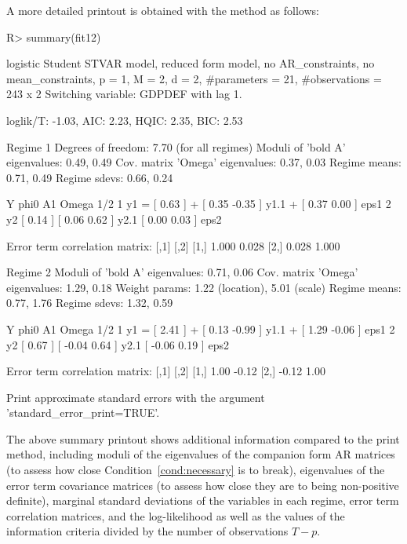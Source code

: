 \documentclass[nojss]{jss}
\begin{document}
A more detailed printout is obtained with the  method as follows:
%
\begin{CodeChunk}
\begin{CodeInput}
R> summary(fit12)
\end{CodeInput}
\begin{CodeOutput}
logistic Student STVAR model, reduced form model, no AR_constraints,
no mean_constraints,
  p = 1, M = 2, d = 2, #parameters = 21, #observations = 243 x 2
  Switching variable: GDPDEF with lag 1.

loglik/T: -1.03, AIC: 2.23, HQIC: 2.35, BIC: 2.53

Regime 1
Degrees of freedom: 7.70 (for all regimes)
Moduli of 'bold A' eigenvalues:  0.49, 0.49
Cov. matrix 'Omega' eigenvalues: 0.37, 0.03
Regime means: 0.71, 0.49
Regime sdevs: 0.66, 0.24

   Y     phi0          A1                  Omega        1/2
1 y1 = [ 0.63 ] + [  0.35 -0.35 ] y1.1 + [  0.37 0.00 ]     eps1
2 y2   [ 0.14 ]   [  0.06  0.62 ] y2.1   [  0.00 0.03 ]     eps2

Error term correlation matrix:
      [,1]  [,2]
[1,] 1.000 0.028
[2,] 0.028 1.000

Regime 2
Moduli of 'bold A' eigenvalues:  0.71, 0.06
Cov. matrix 'Omega' eigenvalues: 1.29, 0.18
Weight params: 1.22 (location), 5.01 (scale)
Regime means: 0.77, 1.76
Regime sdevs: 1.32, 0.59

   Y     phi0          A1                  Omega         1/2
1 y1 = [ 2.41 ] + [  0.13 -0.99 ] y1.1 + [  1.29 -0.06 ]     eps1
2 y2   [ 0.67 ]   [ -0.04  0.64 ] y2.1   [ -0.06  0.19 ]     eps2

Error term correlation matrix:
      [,1]  [,2]
[1,]  1.00 -0.12
[2,] -0.12  1.00

Print approximate standard errors with the argument 'standard_error_print=TRUE'.
\end{CodeOutput}
\end{CodeChunk}
%
The above summary printout shows additional information compared to the print method, including moduli of the eigenvalues of the companion form AR matrices (to assess how close Condition~\ref{cond:necessary} is to break), eigenvalues of the error term covariance matrices (to assess how close they are to being non-positive definite), marginal standard deviations of the variables in each regime, error term correlation matrices, and the log-likelihood as well as the values of the information criteria divided by the number of observations $T-p$.
\end{document}
